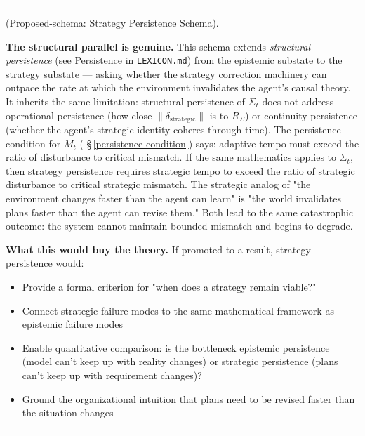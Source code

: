 \documentclass[11pt,oneside]{article}
\newcounter{claim}[section]
\renewcommand{\theclaim}{\thesection.\arabic{claim}}
\newenvironment{segment}[2]{%
  \refstepcounter{claim}%
  \bigskip\noindent\hrule\smallskip
  \noindent{\bfseries #1~\theclaim}\enskip(#2).\par\smallskip
  \noindent\ignorespaces
}{%
  \par\smallskip\noindent\hrule\bigskip
}
\newenvironment{remark}[1][]{\begin{segment}{Remark}{#1}}{\end{segment}}
\begin{document}
\begin{remark}[Proposed-schema: Strategy Persistence Schema]
\textbf{The structural parallel is genuine.} This schema extends \textit{structural persistence} (see Persistence in \texttt{LEXICON.md}) from the epistemic substate to the strategy substate — asking whether the strategy correction machinery can outpace the rate at which the environment invalidates the agent's causal theory. It inherits the same limitation: structural persistence of $\Sigma_t$ does not address operational persistence (how close $\lVert\delta_{\text{strategic}}\rVert$ is to $R_\Sigma$) or continuity persistence (whether the agent's strategic identity coheres through time). The persistence condition for $M_t$ ( \S\,\ref{persistence-condition}) says: adaptive tempo must exceed the ratio of disturbance to critical mismatch. If the same mathematics applies to $\Sigma_t$, then strategy persistence requires strategic tempo to exceed the ratio of strategic disturbance to critical strategic mismatch. The strategic analog of "the environment changes faster than the agent can learn" is "the world invalidates plans faster than the agent can revise them." Both lead to the same catastrophic outcome: the system cannot maintain bounded mismatch and begins to degrade.

\textbf{What this would buy the theory.} If promoted to a result, strategy persistence would:
\begin{itemize}
  \item Provide a formal criterion for "when does a strategy remain viable?"
  \item Connect strategic failure modes to the same mathematical framework as epistemic failure modes
  \item Enable quantitative comparison: is the bottleneck epistemic persistence (model can't keep up with reality changes) or strategic persistence (plans can't keep up with requirement changes)?
  \item Ground the organizational intuition that plans need to be revised faster than the situation changes
\end{itemize}


\end{remark}
\end{document}
